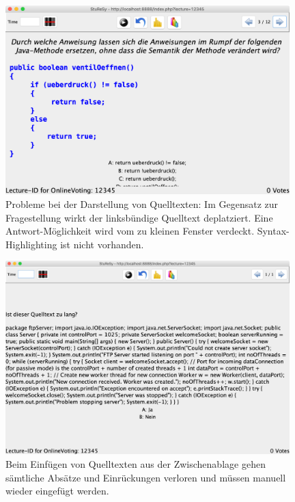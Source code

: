 \begin{figure}[H]
    \includegraphics[width=11cm]{chapter/bewertung/bilder/StuReSy_Problem_2.png}
    \centering
    \caption[Probleme bei der Darstellung von Quelltexten in StuReSy (1)]{Probleme bei der Darstellung von Quelltexten: Im Gegensatz zur Fragestellung wirkt der linksbündige Quelltext deplatziert. Eine Antwort-Möglichkeit wird vom zu kleinen Fenster verdeckt. Syntax-Highlighting ist nicht vorhanden.}
    \label{abb:sturesy_problem_1}
\end{figure}


\begin{figure}[H]
    \includegraphics[width=11cm]{chapter/bewertung/bilder/StuReSy_Problem_3.png}
    \centering
    \caption[Probleme bei der Darstellung von Quelltexten in StuReSy (2)]{Beim Einfügen von Quelltexten aus der Zwischenablage gehen sämtliche Absätze und Einrückungen verloren und müssen manuell wieder eingefügt werden.}
    \label{abb:sturesy_problem_3}
\end{figure}




